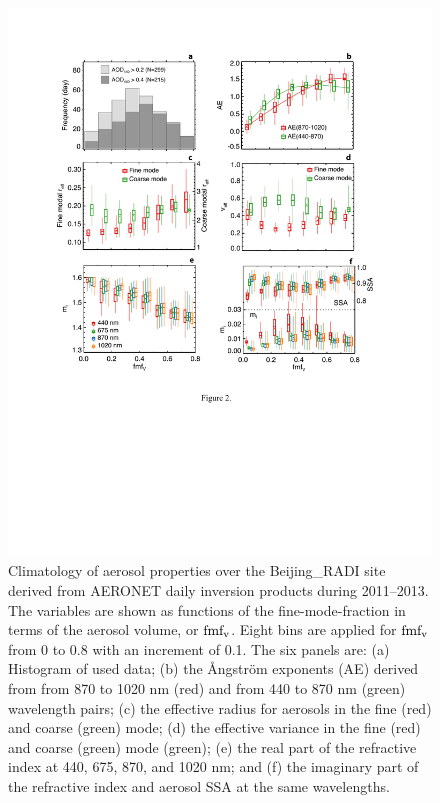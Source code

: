 \begin{figure}[p]
  \centering
  \includegraphics[width={\textwidth}]{figures/inv01.pdf}
  \caption{Climatology of aerosol properties over the Beijing\_RADI site derived
from AERONET daily inversion products during 2011--2013. The variables are shown
as functions of the fine-mode-fraction in terms of the aerosol volume, or
$\text{fmf}_\text{v}$. Eight bins are applied for $\text{fmf}_\text{v}$ from 0 to 0.8 with an increment of 0.1.
The six panels are: (a) Histogram of used data; (b) the Ångström exponents (AE)
derived from from 870 to 1020 nm (red) and from 440 to 870 nm (green)
wavelength pairs; (c) the effective radius for aerosols in the fine (red) and
coarse (green) mode; (d) the effective variance in the fine (red) and coarse
(green) mode (green); (e) the real part of the refractive index at 440, 675,
870, and 1020 nm; and (f) the imaginary part of the refractive index and
aerosol SSA at the same wavelengths.}
  \label{fig:invap}
\end{figure}

